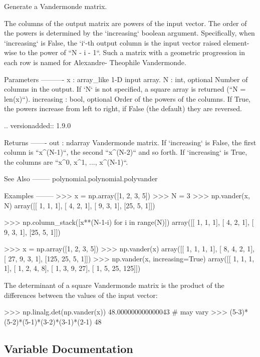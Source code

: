 \begin{DoxyVerb}Generate a Vandermonde matrix.

The columns of the output matrix are powers of the input vector. The
order of the powers is determined by the `increasing` boolean argument.
Specifically, when `increasing` is False, the `i`-th output column is
the input vector raised element-wise to the power of ``N - i - 1``. Such
a matrix with a geometric progression in each row is named for Alexandre-
Theophile Vandermonde.

Parameters
----------
x : array_like
    1-D input array.
N : int, optional
    Number of columns in the output.  If `N` is not specified, a square
    array is returned (``N = len(x)``).
increasing : bool, optional
    Order of the powers of the columns.  If True, the powers increase
    from left to right, if False (the default) they are reversed.

    .. versionadded:: 1.9.0

Returns
-------
out : ndarray
    Vandermonde matrix.  If `increasing` is False, the first column is
    ``x^(N-1)``, the second ``x^(N-2)`` and so forth. If `increasing` is
    True, the columns are ``x^0, x^1, ..., x^(N-1)``.

See Also
--------
polynomial.polynomial.polyvander

Examples
--------
>>> x = np.array([1, 2, 3, 5])
>>> N = 3
>>> np.vander(x, N)
array([[ 1,  1,  1],
       [ 4,  2,  1],
       [ 9,  3,  1],
       [25,  5,  1]])

>>> np.column_stack([x**(N-1-i) for i in range(N)])
array([[ 1,  1,  1],
       [ 4,  2,  1],
       [ 9,  3,  1],
       [25,  5,  1]])

>>> x = np.array([1, 2, 3, 5])
>>> np.vander(x)
array([[  1,   1,   1,   1],
       [  8,   4,   2,   1],
       [ 27,   9,   3,   1],
       [125,  25,   5,   1]])
>>> np.vander(x, increasing=True)
array([[  1,   1,   1,   1],
       [  1,   2,   4,   8],
       [  1,   3,   9,  27],
       [  1,   5,  25, 125]])

The determinant of a square Vandermonde matrix is the product
of the differences between the values of the input vector:

>>> np.linalg.det(np.vander(x))
48.000000000000043 # may vary
>>> (5-3)*(5-2)*(5-1)*(3-2)*(3-1)*(2-1)
48\end{DoxyVerb}
 

\subsection{Variable Documentation}
\mbox{\label{namespacenumpy_1_1lib_1_1twodim__base_a12fefeaaa42281321c1a4d46f5466e78}} 
